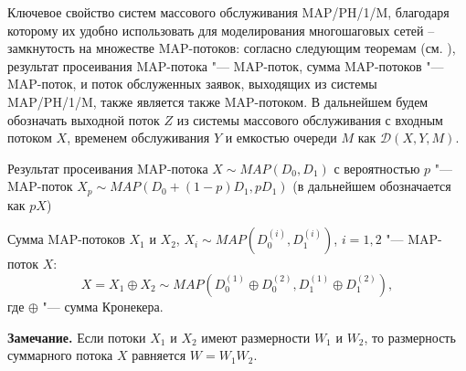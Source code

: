 Ключевое свойство систем массового обслуживания MAP/PH/1/M, благодаря которому их удобно использовать для моделирования многошаговых сетей -- замкнутость на множестве MAP-потоков: согласно следующим теоремам (см. \cite{VishnevskyDudin2018}), результат просеивания MAP-потока "--- MAP-поток, сумма MAP-потоков "--- MAP-поток, и поток обслуженных заявок, выходящих из системы MAP/PH/1/M, также является также MAP-потоком. В дальнейшем будем обозначать выходной поток $Z$ из системы массового обслуживания с входным потоком $X$, временем обслуживания $Y$ и емкостью очереди $M$ как $\mathcal{D}(X, Y, M)$.

\begin{thm}\label{th:ch4_sifted_map}\textnormal{\cite{VishnevskyDudin2018}}
  Результат просеивания MAP-потока $X \sim MAP(D_{0},D_{1})$ с вероятностью $p$ "--- MAP-поток $X_{p} \sim MAP(D_{0}+(1-p)D_{1},pD_{1})$ (в дальнейшем обозначается как $pX$)
\end{thm}

\begin{thm}\label{th:ch4_maps_sum}\textnormal{\cite{VishnevskyDudin2018}}
  Сумма MAP-потоков $X_{1}$ и $X_{2}$, $X_i \sim MAP(D_{0}^{(i)},D_{1}^{(i)})$, $i=1,2$ "--- MAP-поток $X$:
  $$
    X = X_{1} \oplus X_{2} \sim MAP(D_{0}^{(1)} \oplus D_{0}^{(2)},D_{1}^{(1)} \oplus D_{1}^{(2)}),
  $$
  где $\oplus$ "--- сумма Кронекера.
\end{thm}

\textbf{Замечание.} Если потоки $X_1$ и $X_2$ имеют размерности $W_1$ и $W_2$, то размерность суммарного потока $X$ равняется $W = W_1 W_2$.

